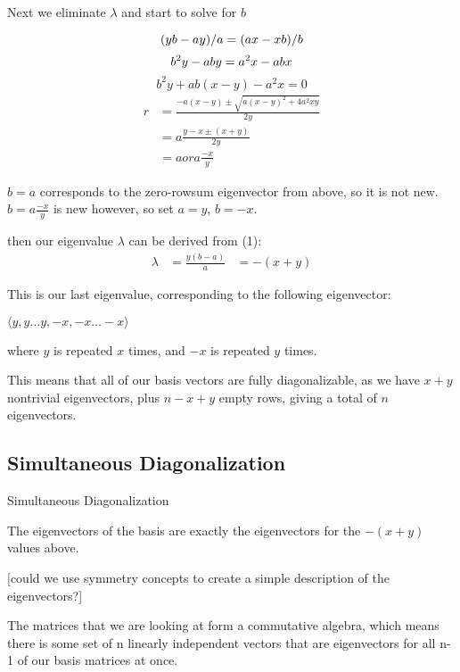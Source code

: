 \documentclass{article}
\begin{document}
Next we eliminate $\lambda$ and start to solve for $b$

\begin{equation*}
	(yb - ay)/a = (ax - xb)/b\\
\end{equation*}
\begin{equation*}
	b^2y - aby = a^2x - abx\\
\end{equation*}
\begin{equation*}
	b^2y + ab(x - y) - a^2x = 0
\end{equation*}
\begin{align*}
	r &= \frac{-a(x-y) \pm \sqrt{{a(x-y)}^2 + 4a^2xy}}{2y}\\
	  &= a\frac{y - x \pm (x + y)}{2y}\\
	  &= a or a\frac{-x}{y}
\end{align*}

$b = a$ corresponds to the zero-rowsum eigenvector from above, so it is not
new.
$b = a\frac{-x}{y}$ is new however, so set $a = y$, $b = -x$.

then our eigenvalue $\lambda$ can be derived from (1):
\begin{align*}
	\lambda &= \frac{y(b - a)}{a}
			&= -(x + y)
\end{align*}

This is our last eigenvalue, corresponding to the following eigenvector:

$\langle y, y\ldots y, -x, -x\ldots -x\rangle$

where $y$ is repeated $x$ times, and $-x$ is repeated $y$ times.

This means that all of our basis vectors are fully diagonalizable, as we have
$x+y$ nontrivial eigenvectors, plus $n-x+y$ empty rows, giving a total of $n$
eigenvectors.

\subsection{Simultaneous Diagonalization}

\begin{theorem} Simultaneous Diagonalization

	The eigenvectors of the basis are exactly the eigenvectors for the $-(x+y)$ values above.

	[could we use symmetry concepts to create a simple description of the eigenvectors?]
\end{theorem}

The matrices that we are looking at form a commutative algebra, which means
there is some set of n linearly independent vectors that are eigenvectors for
all n-1 of our basis matrices at once.
\end{document}
